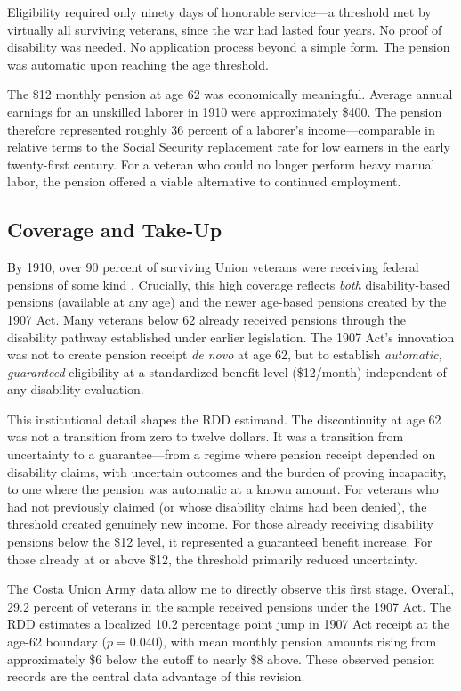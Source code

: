 \documentclass[12pt]{article}
\begin{document}
Eligibility required only ninety days of honorable service---a threshold met by virtually all surviving veterans, since the war had lasted four years. No proof of disability was needed. No application process beyond a simple form. The pension was automatic upon reaching the age threshold.

The \$12 monthly pension at age 62 was economically meaningful. Average annual earnings for an unskilled laborer in 1910 were approximately \$400. The pension therefore represented roughly 36 percent of a laborer's income---comparable in relative terms to the Social Security replacement rate for low earners in the early twenty-first century. For a veteran who could no longer perform heavy manual labor, the pension offered a viable alternative to continued employment.

\subsection{Coverage and Take-Up}

By 1910, over 90 percent of surviving Union veterans were receiving federal pensions of some kind \citep{costa1998pensions}. Crucially, this high coverage reflects \textit{both} disability-based pensions (available at any age) and the newer age-based pensions created by the 1907 Act. Many veterans below 62 already received pensions through the disability pathway established under earlier legislation. The 1907 Act's innovation was not to create pension receipt \textit{de novo} at age 62, but to establish \textit{automatic, guaranteed} eligibility at a standardized benefit level (\$12/month) independent of any disability evaluation.

This institutional detail shapes the RDD estimand. The discontinuity at age 62 was not a transition from zero to twelve dollars. It was a transition from uncertainty to a guarantee---from a regime where pension receipt depended on disability claims, with uncertain outcomes and the burden of proving incapacity, to one where the pension was automatic at a known amount. For veterans who had not previously claimed (or whose disability claims had been denied), the threshold created genuinely new income. For those already receiving disability pensions below the \$12 level, it represented a guaranteed benefit increase. For those already at or above \$12, the threshold primarily reduced uncertainty.

The Costa Union Army data allow me to directly observe this first stage. Overall, 29.2 percent of veterans in the sample received pensions under the 1907 Act. The RDD estimates a localized 10.2 percentage point jump in 1907 Act receipt at the age-62 boundary ($p = 0.040$), with mean monthly pension amounts rising from approximately \$6 below the cutoff to nearly \$8 above. These observed pension records are the central data advantage of this revision.
\end{document}
